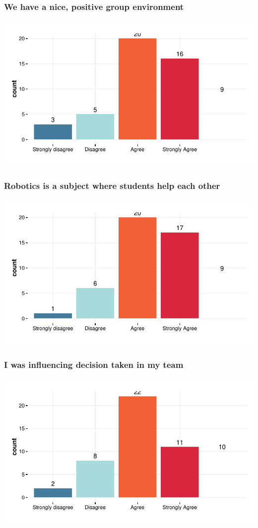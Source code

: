 \documentclass{article}
\begin{document}
\subsubsection{We have a nice, positive group environment }
\includegraphics{Raw_num/plots/-plot_good_team}

\subsubsection{Robotics is a subject where students help each other}
\includegraphics{Raw_num/plots/-plot_student_help_robotik}

\subsubsection{I was influencing decision taken in my team}
\includegraphics{Raw_num/plots/-plot_influence_teamates}
\end{document}
